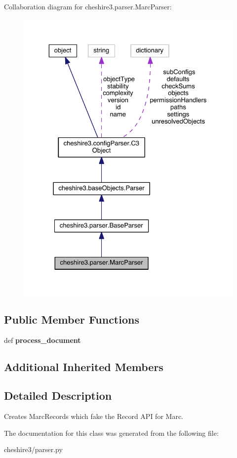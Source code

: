 Collaboration diagram for cheshire3.\-parser.\-Marc\-Parser\-:
\nopagebreak
\begin{figure}[H]
\begin{center}
\leavevmode
\includegraphics[width=325pt]{classcheshire3_1_1parser_1_1_marc_parser__coll__graph}
\end{center}
\end{figure}
\subsection*{Public Member Functions}
\begin{DoxyCompactItemize}
\item 
\hypertarget{classcheshire3_1_1parser_1_1_marc_parser_a76d407c31244de6d366ee612c6452025}{def {\bfseries process\-\_\-document}}\label{classcheshire3_1_1parser_1_1_marc_parser_a76d407c31244de6d366ee612c6452025}

\end{DoxyCompactItemize}
\subsection*{Additional Inherited Members}


\subsection{Detailed Description}
\begin{DoxyVerb}Creates MarcRecords which fake the Record API for Marc.\end{DoxyVerb}
 

The documentation for this class was generated from the following file\-:\begin{DoxyCompactItemize}
\item 
cheshire3/parser.\-py\end{DoxyCompactItemize}
